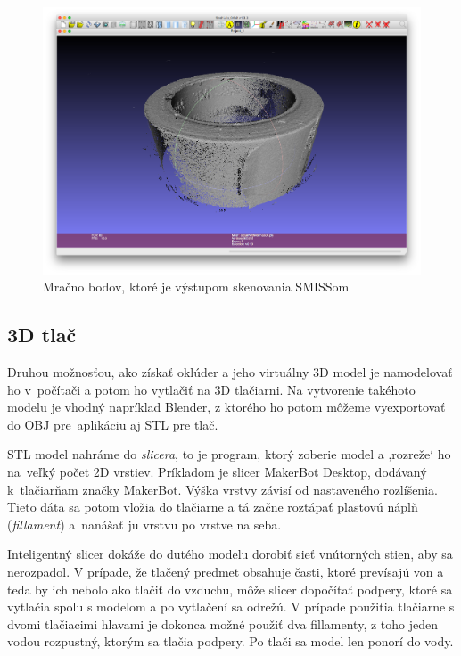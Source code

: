 \begin{figure}[h]
 \centering
 \includegraphics[max width=\textwidth]{pictures/smiss-pointcloud.png}
 \caption{Mračno bodov, ktoré je výstupom skenovania SMISSom}
 \label{paska-cloud}
 \end{figure}

\subsection{3D tlač}

Druhou možnosťou, ako získať oklúder a jeho virtuálny 3D model je namodelovať ho v~počítači a potom ho vytlačiť na 3D tlačiarni. Na vytvorenie takéhoto modelu je vhodný napríklad Blender, z ktorého ho potom môžeme vyexportovať do OBJ pre~aplikáciu aj STL pre tlač.

STL model nahráme do \emph{slicera}, to je program, ktorý zoberie model a ‚rozreže‘ ho na~veľký počet 2D vrstiev. Príkladom je slicer MakerBot Desktop, dodávaný k~tlačiarňam značky MakerBot. Výška vrstvy závisí od nastaveného rozlíšenia. Tieto dáta sa potom vložia do tlačiarne a tá začne roztápať plastovú náplň (\emph{fillament}) a~nanášať ju vrstvu po vrstve na seba.

Inteligentný slicer dokáže do dutého modelu dorobiť sieť vnútorných stien, aby sa nerozpadol. V prípade, že tlačený predmet obsahuje časti, ktoré prevísajú von a teda by ich nebolo ako tlačiť do vzduchu, môže slicer dopočítať podpery, ktoré sa vytlačia spolu s modelom a po vytlačení sa odrežú. V prípade použitia tlačiarne s dvomi tlačiacimi hlavami je dokonca možné použiť dva fillamenty, z toho jeden vodou rozpustný, ktorým sa tlačia podpery. Po tlači sa model len ponorí do vody.

